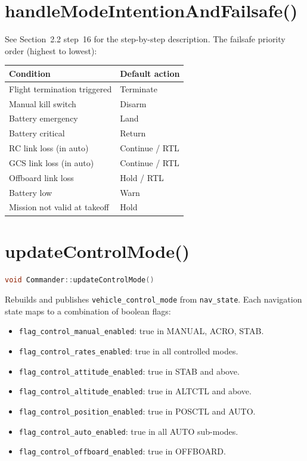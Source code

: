 \documentclass[12pt,a4paper]{article}
\begin{document}
\section{handleModeIntentionAndFailsafe()}

See Section~2.2 step~16 for the step-by-step description.
The failsafe priority order (highest to lowest):

\begin{center}\begin{tabular}{ll}\toprule
Condition & Default action \\\midrule
Flight termination triggered & Terminate \\
Manual kill switch & Disarm \\
Battery emergency & Land \\
Battery critical & Return \\
RC link loss (in auto) & Continue / RTL \\
GCS link loss (in auto) & Continue / RTL \\
Offboard link loss & Hold / RTL \\
Battery low & Warn \\
Mission not valid at takeoff & Hold \\
\bottomrule\end{tabular}\end{center}

\section{updateControlMode()}

\begin{lstlisting}[language=C++]
void Commander::updateControlMode()
\end{lstlisting}

Rebuilds and publishes \texttt{vehicle\_control\_mode} from \texttt{nav\_state}.
Each navigation state maps to a combination of boolean flags:
\begin{itemize}
  \item \texttt{flag\_control\_manual\_enabled}: true in MANUAL, ACRO, STAB.
  \item \texttt{flag\_control\_rates\_enabled}: true in all controlled modes.
  \item \texttt{flag\_control\_attitude\_enabled}: true in STAB and above.
  \item \texttt{flag\_control\_altitude\_enabled}: true in ALTCTL and above.
  \item \texttt{flag\_control\_position\_enabled}: true in POSCTL and AUTO.
  \item \texttt{flag\_control\_auto\_enabled}: true in all AUTO sub-modes.
  \item \texttt{flag\_control\_offboard\_enabled}: true in OFFBOARD.
\end{itemize}
\end{document}
